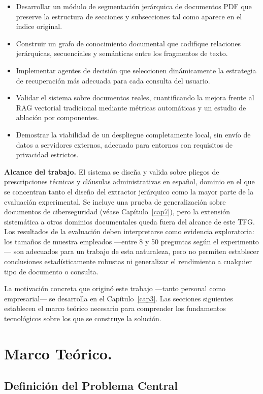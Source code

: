 \begin{itemize}
    \item Desarrollar un módulo de segmentación jerárquica de documentos PDF que preserve la estructura de secciones y subsecciones tal como aparece en el índice original.
    \item Construir un grafo de conocimiento documental que codifique relaciones jerárquicas, secuenciales y semánticas entre los fragmentos de texto.
    \item Implementar agentes de decisión que seleccionen dinámicamente la estrategia de recuperación más adecuada para cada consulta del usuario.
    \item Validar el sistema sobre documentos reales, cuantificando la mejora frente al RAG vectorial tradicional mediante métricas automáticas y un estudio de ablación por componentes.
    \item Demostrar la viabilidad de un despliegue completamente local, sin envío de datos a servidores externos, adecuado para entornos con requisitos de privacidad estrictos.
\end{itemize}

\textbf{Alcance del trabajo.} El sistema se diseña y valida sobre pliegos de prescripciones técnicas y cláusulas administrativas en español, dominio en el que se concentran tanto el diseño del extractor jerárquico como la mayor parte de la evaluación experimental. Se incluye una prueba de generalización sobre documentos de ciberseguridad (véase Capítulo~\ref{cap7}), pero la extensión sistemática a otros dominios documentales queda fuera del alcance de este TFG. Los resultados de la evaluación deben interpretarse como evidencia exploratoria: los tamaños de muestra empleados —entre 8 y 50 preguntas según el experimento— son adecuados para un trabajo de esta naturaleza, pero no permiten establecer conclusiones estadísticamente robustas ni generalizar el rendimiento a cualquier tipo de documento o consulta.

La motivación concreta que originó este trabajo —tanto personal como empresarial— se desarrolla en el Capítulo~\ref{cap3}. Las secciones siguientes establecen el marco teórico necesario para comprender los fundamentos tecnológicos sobre los que se construye la solución.
\newpage
\section{Marco Teórico.}

\subsection{Definición del Problema Central}\label{sec:problema_central}

